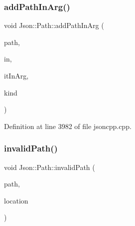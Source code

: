 \subsubsection{\texorpdfstring{add\+Path\+In\+Arg()}{addPathInArg()}}
{\footnotesize\ttfamily void Json\+::\+Path\+::add\+Path\+In\+Arg (\begin{DoxyParamCaption}\item[{const \hyperlink{json_8h_a1e723f95759de062585bc4a8fd3fa4be}{J\+S\+O\+N\+C\+P\+P\+\_\+\+S\+T\+R\+I\+NG} \&}]{path,  }\item[{const \hyperlink{class_json_1_1_path_ab29d7b2fc896c7d3c5ed4609af3a3f23}{In\+Args} \&}]{in,  }\item[{In\+Args\+::const\+\_\+iterator \&}]{it\+In\+Arg,  }\item[{\hyperlink{class_json_1_1_path_argument_a2420bbad778573c147e578701b84d9b9}{Path\+Argument\+::\+Kind}}]{kind }\end{DoxyParamCaption})\hspace{0.3cm}{\ttfamily [private]}}



Definition at line 3982 of file jsoncpp.\+cpp.


\mbox{\label{class_json_1_1_path_a0fa77fc0cefefcfcf2f1242c79009dd9}} 
\subsubsection{\texorpdfstring{invalid\+Path()}{invalidPath()}}
{\footnotesize\ttfamily void Json\+::\+Path\+::invalid\+Path (\begin{DoxyParamCaption}\item[{const \hyperlink{json_8h_a1e723f95759de062585bc4a8fd3fa4be}{J\+S\+O\+N\+C\+P\+P\+\_\+\+S\+T\+R\+I\+NG} \&}]{path,  }\item[{int}]{location }\end{DoxyParamCaption})\hspace{0.3cm}{\ttfamily [private]}}



